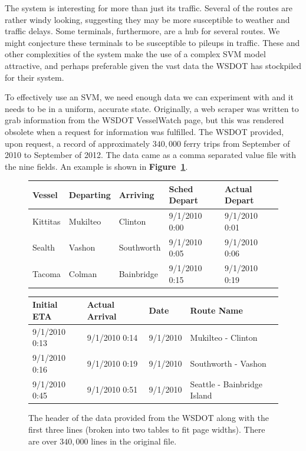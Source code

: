 \documentclass[11pt]{article} %
\begin{document}
The system is interesting for more than just its traffic. Several of the routes
are rather windy looking, suggesting they may be more susceptible to weather and
traffic delays. Some terminals, furthermore, are a hub for several routes. We
might conjecture these terminals to be susceptible to pileups in traffic. These 
and other complexities of the system make the use of a complex SVM model attractive,
and perhaps preferable given the vast data the WSDOT has stockpiled for their
system. 

To effectively use an SVM, we need enough data we can experiment with and it needs
to be in a uniform, accurate state. Originally, a web scraper was written to grab
information from the WSDOT VesselWatch \cite{wsdotVesselWatch} page, but this was 
rendered obsolete when a request for information was fulfilled. The WSDOT 
provided, upon request, a record of
approximately $340,000$ ferry trips from September of 2010 to September of 2012. The
data came as a comma separated value file with the nine fields. An example is shown
in \textbf{Figure~\ref{fig:example_wsdot_data}}.

\begin{figure}
    \centering
    \begin{tabular}[h]{lllll}
        \hline
        Vessel & Departing & Arriving & Sched Depart & Actual Depart \\
        \hline
        Kittitas & Mukilteo & Clinton & 9/1/2010 0:00 & 9/1/2010 0:01 \\
        Sealth & Vashon & Southworth & 9/1/2010 0:05 & 9/1/2010 0:06 \\
        Tacoma & Colman & Bainbridge & 9/1/2010 0:15 & 9/1/2010 0:19 \\
    \end{tabular}

    \begin{tabular}[h]{llll}
        \hline
        Initial ETA & Actual Arrival & Date & Route Name\\
        \hline
        9/1/2010 0:13 & 9/1/2010 0:14 & 9/1/2010 & Mukilteo - Clinton \\
        9/1/2010 0:16 & 9/1/2010 0:19 & 9/1/2010 & Southworth - Vashon \\
        9/1/2010 0:45 & 9/1/2010 0:51 & 9/1/2010 & Seattle - Bainbridge Island \\
    \end{tabular}
    \caption{The header of the data provided from the WSDOT along with the first
        three lines (broken into two tables
        to fit page widths). There are over $340,000$ lines in the original file.}
    \label{fig:example_wsdot_data}
\end{figure}
\end{document}

